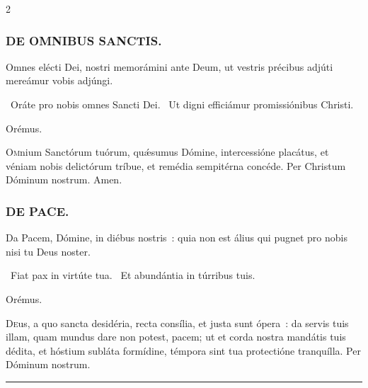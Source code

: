 \documentclass[9pt,twoside]{extarticle}
\begin{document}
\begin{multicols}{2}
{{\subsubsection*{\center \textsc{DE OMNIBUS SANCTIS.}}
\begin{tightlist}{}
\item {} Omnes elécti Dei, nostri memorámini ante Deum, ut vestris précibus adjúti mereámur vobis adjúngi.
\item {}~Oráte pro nobis omnes Sancti Dei. ~Ut digni efficiámur promissiónibus Christi.
\item Orémus. \hfill {}
\end{tightlist}
\lettrine{O}mnium Sanctórum tuórum, quǽsumus Dómine, intercessióne placátus, et véniam nobis delictórum tríbue, et remédia sempitérna concéde. Per Christum Dóminum nostrum. Amen.

\subsubsection*{\center \textsc{DE PACE.}}
\begin{tightlist}{}
\item {} Da Pacem, Dómine, in diébus nostris~: quia non est álius qui pugnet pro nobis nisi tu Deus noster.
\item {}~Fiat pax in virtúte tua. ~Et abundántia in túrribus tuis.
\item Orémus. \hfill {}
\end{tightlist}
\lettrine{D}eus, a quo sancta desidéria, recta consília, et justa sunt ópera~: da servis tuis illam, quam mundus dare non potest, pacem; ut et corda nostra mandátis tuis dédita, et hóstium subláta formídine, témpora sint tua protectióne tranquílla. Per Dóminum nostrum.

\begin{center}\textcolor{red}{\rule{\linewidth}{0.5pt}} \end{center}

}}
\end{multicols}
\end{document}
